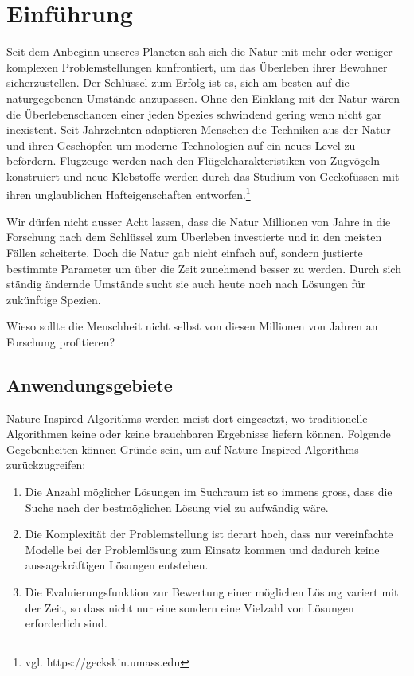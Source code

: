 \chapter{Einführung}

Seit dem Anbeginn unseres Planeten sah sich die Natur mit mehr oder weniger
komplexen Problemstellungen konfrontiert, um das Überleben ihrer Bewohner
sicherzustellen. Der Schlüssel zum Erfolg ist es, sich am besten auf die
naturgegebenen Umstände anzupassen. Ohne den Einklang mit der Natur wären die
Überlebenschancen einer jeden Spezies schwindend gering wenn nicht gar inexistent.
Seit Jahrzehnten adaptieren Menschen die Techniken aus der Natur und ihren Geschöpfen
um moderne Technologien auf ein neues Level zu befördern. Flugzeuge werden nach den
Flügelcharakteristiken von Zugvögeln konstruiert und neue Klebstoffe werden durch das
Studium von Geckofüssen mit ihren unglaublichen Hafteigenschaften entworfen.\footnote{vgl. https://geckskin.umass.edu}

Wir dürfen nicht ausser Acht lassen, dass die Natur Millionen von Jahre in die Forschung
nach dem Schlüssel zum Überleben investierte und in den meisten Fällen scheiterte. Doch
die Natur gab nicht einfach auf, sondern justierte bestimmte Parameter um über die Zeit
zunehmend besser zu werden. Durch sich ständig ändernde Umstände sucht sie auch heute noch
nach Lösungen für zukünftige Spezien.

Wieso sollte die Menschheit nicht selbst von diesen Millionen von Jahren an Forschung profitieren?

\section{Anwendungsgebiete}

Nature-Inspired Algorithms werden meist dort eingesetzt, wo traditionelle Algorithmen keine oder
keine brauchbaren Ergebnisse liefern können. Folgende Gegebenheiten können Gründe sein, um auf
Nature-Inspired Algorithms zurückzugreifen:

\begin{enumerate}
    \item Die Anzahl möglicher Lösungen im Suchraum ist so immens gross, dass die Suche nach der bestmöglichen
          Lösung viel zu aufwändig wäre.
    \item Die Komplexität der Problemstellung ist derart hoch, dass nur vereinfachte Modelle bei der Problemlösung
          zum Einsatz kommen und dadurch keine aussagekräftigen Lösungen entstehen.
    \item Die Evaluierungsfunktion zur Bewertung einer möglichen Lösung variert mit der Zeit, so dass nicht nur eine
          sondern eine Vielzahl von Lösungen erforderlich sind.
\end{enumerate}

